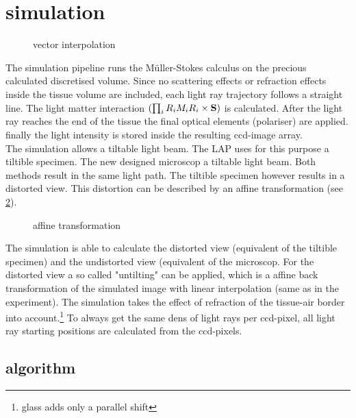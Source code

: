 \section{simulation}
\label{sec:simulation}
% 
\begin{figure}[!t]
\centering
\def\tikzwidth{0.5*\textwidth}
\caption{vector interpolation}
\label{fig:vectorfield_disc}
\end{figure}
% 
The simulation pipeline runs the M\"uller-Stokes calculus on the precious calculated discretised volume.
Since no scattering effects or refraction effects inside the tissue volume are included, each light ray trajectory follows a straight line.
The light matter interaction $\left( \prod_i R_i M_i R_i \times \mathbf{S} \right)$ is calculated. 
After the light ray reaches the end of the tissue the final optical elements (\eg polariser) are applied.
finally the light intensity is stored inside the resulting ccd-image array.\\
% 
The simulation allows a tiltable light beam.
The \ac{LAP} uses for this purpose a tiltible specimen.
The new designed microscop a tiltable light beam.
Both methods result in the same light path.
The tiltible specimen however results in a distorted view.
This distortion can be described by an affine transformation (see \cref{fig::affine_transformation}).
% 
\begin{figure}[!t]
\centering

\caption{affine transformation}
\label{fig::affine_transformation}
\end{figure}
% 
The simulation is able to calculate the distorted view (equivalent of the tiltible specimen) and the undistorted view (equivalent of the microscop. 
For the distorted view a so called "untilting" can be applied, which is a affine back transformation of the simulated image with linear interpolation (same as in the experiment).
% 
The simulation takes the effect of refraction of the tissue-air border into account.\footnote{glass adds only a parallel shift}
% 
To always get the same dens of light rays per ccd-pixel, all light ray starting positions are calculated from the ccd-pixels.
% 
\subsection{algorithm}
% 
